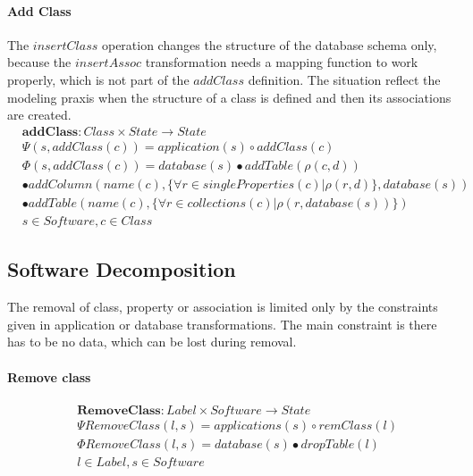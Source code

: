 \documentclass[11pt]{article}
\begin{document}
\paragraph{Add Class} The $insertClass$ operation changes the structure of the database schema only, because the $insertAssoc$ transformation needs a mapping function to work properly, which is not part of the $addClass$ definition. The situation reflect the modeling praxis when the structure of a class is defined and then its associations are created.
\begin{align*}
& \mathbf{addClass} : Class \times State \rightarrow State \\
& \Psi(s, addClass(c)) = application(s) \circ addClass(c) \\
& \Phi(s, addClass(c)) = database(s)  \bullet addTable(\rho(c,d)) \\ 
& \bullet addColumn(name(c), \{\forall r \in singleProperties(c) | \rho(r,d)\}, database(s)) \\
& \bullet addTable(name(c), \{\forall r \in collections(c) | \rho(r,database(s))\})  \\
& s \in Software, c \in Class
\end{align*}




\subsection{Software Decomposition}
The removal of class, property or association is limited only by the constraints given in application or database transformations. The main constraint is there has to be no data, which can be lost during removal. 
\paragraph{Remove class}
\begin{align*}
&	\mathbf{RemoveClass}: Label \times Software \rightarrow State  \\
&	\Psi RemoveClass(l, s) = applications(s) \circ remClass(l) \\
&	\Phi RemoveClass(l, s) = database(s) \bullet dropTable(l) \\
&	l \in Label, s \in Software 
\end{align*}
\end{document}
